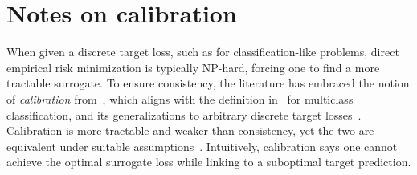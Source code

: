 \documentclass[anon,12pt]{colt2021} %
\begin{document}
%
%
%
%


%


\newpage
\appendix
\section{Notes on calibration}\label{app:calibration}

When given a discrete target loss, such as for classification-like problems, direct empirical risk minimization is typically NP-hard, forcing one to find a more tractable surrogate.
To ensure consistency, the literature has embraced the notion of \emph{calibration} from~\citet[Chapter 3]{steinwart2008support}, which aligns with the definition in~\citet{tewari2007consistency} for multiclass classification, and its generalizations to arbitrary discrete target losses~\citep{agarwal2015consistent,ramaswamy2016convex}.
Calibration is more tractable and weaker than consistency, yet the two are equivalent under suitable assumptions~\citep{tewari2007consistency,ramaswamy2016convex}.
Intuitively, calibration says one cannot achieve the optimal surrogate loss while linking to a suboptimal target prediction.
\end{document}
